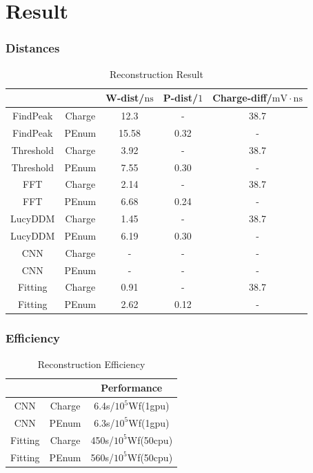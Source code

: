 \documentclass[handout]{beamer}
\begin{document}
\section{Result}
\begin{frame}
\frametitle{Distances}
\setlength{\belowcaptionskip}{-2mm}
\begin{table}
    \centering
    \caption{Reconstruction Result}
    \begin{tabular}{c|c|c|c|c}
        \hline
        &  & W-dist/$\mathrm{ns}$ & P-dist/$\mathrm{1}$ & Charge-diff/$\mathrm{mV}\cdot\mathrm{ns}$ \\
        \hline
        FindPeak & Charge & 12.3 & - & 38.7 \\
        \hline
        FindPeak & PEnum & 15.58 & 0.32 & - \\
        \hline
        Threshold & Charge & 3.92 & - & 38.7 \\
        \hline
        Threshold & PEnum & 7.55 & 0.30 & - \\
        \hline
        FFT & Charge & 2.14 & - & 38.7 \\
        \hline
        FFT & PEnum & 6.68 & 0.24 & - \\
        \hline
        LucyDDM & Charge & 1.45 & - & 38.7 \\
        \hline
        LucyDDM & PEnum & 6.19 & 0.30 & - \\
        \hline
        CNN & Charge & - & - & - \\
        \hline
        CNN & PEnum & - & - & - \\
        \hline
        Fitting & Charge & 0.91 & - & 38.7 \\
        \hline
        Fitting & PEnum & 2.62 & 0.12 & - \\
        \hline
    \end{tabular}
\end{table}
\end{frame}

\begin{frame}
\frametitle{Efficiency}
\begin{table}
    \centering
    \caption{Reconstruction Efficiency}
    \begin{tabular}{c|c|c}
        \hline
        &  & Performance \\
        \hline
        CNN & Charge & 6.4s/$10^{5}$Wf(1gpu) \\
        \hline
        CNN & PEnum & 6.3s/$10^{5}$Wf(1gpu)\\
        \hline
        Fitting & Charge & 450s/$10^{5}$Wf(50cpu) \\
        \hline
        Fitting & PEnum & 560s/$10^{5}$Wf(50cpu) \\
        \hline
    \end{tabular}
\end{table}
\end{frame}
\end{document}
